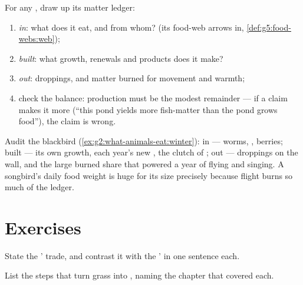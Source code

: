 \begin{method}\label{met:g6:matter-from-food:audit}
For any , draw up its matter ledger:
\begin{enumerate}
  \item \emph{in}: what  does it eat, and from
        whom? (its food-web arrows in,
        \cref{def:g5:food-webs:web});
  \item \emph{built}: what growth, renewals and products
        does it make?
  \item \emph{out}: droppings, and matter burned for
        movement and warmth;
  \item check the balance: production must be the modest
        remainder --- if a claim makes it more (``this pond
        yields more fish-matter than the pond grows food''),
        the claim is wrong.
\end{enumerate}
\end{method}

\begin{example}\label{ex:g6:matter-from-food:audituse}
Audit the blackbird (\cref{ex:g2:what-animals-eat:winter}):
in --- worms, , berries; built --- its own growth,
each year's new , the clutch of ; out ---
droppings on the wall, and the large burned share that
powered a year of flying and singing. A songbird's daily
food weight is huge for its size precisely because flight
burns so much of the ledger.
\end{example}

\section{Exercises}

\begin{exercise}[$\star$]\label{exo:g6:matter-from-food:1}
State the ' trade, and contrast it with the
' in one sentence each.
\end{exercise}

\begin{exercise}[$\star$]\label{exo:g6:matter-from-food:2}
List the steps that turn grass into , naming the
chapter that covered each.
\end{exercise}

